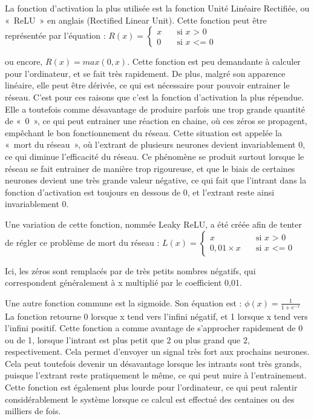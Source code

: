 \documentclass[letterpaper,10pt,french]{sphinxmanual}
\begin{document}
La fonction d’activation la plus utilisée est la fonction Unité Linéaire Rectifiée, ou « ReLU » en anglais (Rectified Linear Unit).
Cette fonction peut être représentée par l’équation :  \(
R(x)=
\begin{cases}
 x & \quad \text{si } x \text{ > 0}\\
 0 & \quad \text{si } x \text{ <= 0}
\end{cases}
\)

ou encore, \( R(x) = max(0, x)\). Cette fonction est peu demandante à calculer pour l’ordinateur, et se fait très rapidement. De plus, malgré son apparence linéaire,
elle peut être dérivée, ce qui est nécessaire pour pouvoir entrainer le réseau. C’est pour ces raisons que c’est la fonction d’activation la plus répendue.
Elle a toutefois comme désavantage de produire parfois une trop grande quantité de « 0 », ce qui peut entrainer une réaction en chaine, où ces zéros se propagent,
empêchant le bon fonctionnement du réseau. Cette situation est appelée la « mort du réseau », où l’extrant de plusieurs neurones devient invariablement 0, ce qui
diminue l’efficacité du réseau. Ce phénomène se produit surtout lorsque le réseau se fait entrainer de manière trop rigoureuse, et que le biais de certaines
neurones devient une très grande valeur négative, ce qui fait que l’intrant dans la fonction d’activation est toujours en dessous de 0, et l’extrant reste ainsi
invariablement 0.

Une variation de cette fonction, nommée Leaky ReLU, a été créée afin de tenter de régler ce problème de mort du réseau : \( 
L(x)=
\begin{cases}
 x & \quad \text{si } x \text{ > 0}\\
 0,01 \times x & \quad \text{si } x \text{ <= 0}
\end{cases}
\)

Ici, les zéros sont remplacés par de très petits nombres négatifs, qui correspondent généralement à x multiplié par le coefficient 0,01.

Une autre fonction commune est la sigmoide. Son équation est :
\( \phi(x) = 
\frac{1}{1 + e^{-x}}
\)
La fonction retourne 0 lorsque x tend vers l’infini négatif, et 1 lorsque x tend vers l’infini positif. Cette fonction a comme avantage de
s’approcher rapidement de 0 ou de 1, lorsque l’intrant  est plus petit que \sphinxhyphen{}2 ou plus grand que 2, respectivement. Cela permet d’envoyer
un signal très fort aux prochains neurones. Cela peut toutefois devenir un désavantage lorsque les intrants sont très grands, puisque l’extrant
reste pratiquement le même, ce qui peut nuire à l’entrainement. Cette fonction est également plus lourde pour l’ordinateur, ce qui peut ralentir
considérablement le système lorsque ce calcul est effectué des centaines ou des milliers de fois.
\end{document}
